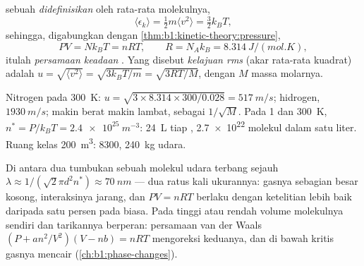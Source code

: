 \begin{definition}\label{def:b1:kinetic-theory:kinetictemp}
 sebuah  \emph{didefinisikan} oleh  rata-rata
molekulnya,
\[
\langle\epsilon_k\rangle = \tfrac12 m\langle v^2\rangle = \tfrac32 k_BT ,
\]
sehingga, digabungkan dengan \cref{thm:b1:kinetic-theory:pressure},
\[
PV = Nk_BT = nRT, \qquad R = N_Ak_B = \qty{8.314}{J/(mol.K)} ,
\]
itulah \emph{persamaan keadaan }. Yang disebut \emph{kelajuan rms}
(akar rata-rata kuadrat) adalah $u = \sqrt{\langle v^2\rangle} = \sqrt{3k_BT/m} = \sqrt{3RT/M}$,
dengan $M$ massa molarnya.
\end{definition}

\begin{example}\label{ex:b1:kinetic-theory:air}
Nitrogen pada \qty{300}{K}: $u = \sqrt{3 \times 8.314 \times 300/0.028} =
\qty{517}{m/s}$; hidrogen, $\qty{1930}{m/s}$; makin berat makin lambat, sebagai
$1/\sqrt M$. Pada \qty{1}{} dan \qty{300}{K}, $n^* = P/k_BT = \qty{2.4e25}{m^{-3}}$:
\qty{24}{L} tiap , \qty{2.7e22}{} molekul dalam satu liter. Ruang kelas
\qty{200}{m^3}: \qty{8300}{}, \qty{240}{kg} udara.
\end{example}

\begin{remark}\label{rem:b1:kinetic-theory:validity}
Di antara dua tumbukan sebuah molekul udara terbang sejauh \emph{}
$\lambda \approx 1/(\sqrt2\pi d^2n^*) \approx \qty{70}{nm}$ --- dua ratus
kali ukurannya: gasnya sebagian besar kosong, interaksinya jarang, dan
$PV = nRT$ berlaku dengan ketelitian lebih baik daripada satu persen pada  biasa. Pada 
tinggi atau  rendah volume molekulnya sendiri dan tarikannya
berperan: persamaan van der Waals $(P + an^2/V^2)(V - nb) = nRT$
mengoreksi keduanya, dan di bawah  kritis gasnya mencair
(\cref{ch:b1:phase-changes}).
\end{remark}

